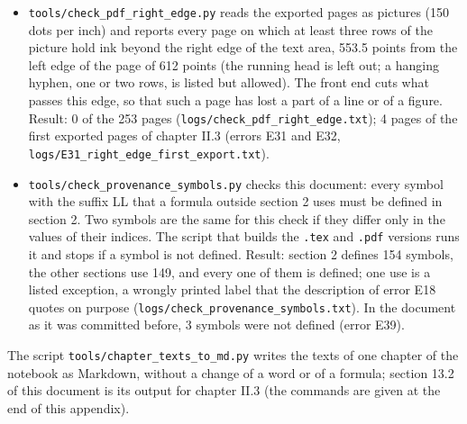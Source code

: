 \documentclass[
  10pt,
]{article}
\begin{document}
\begin{itemize}
  is used in a later chapter only if a table of the script declares it
  as the same object (for example the couplings and the colors of the
  figures), and that no global name is used as a local name (a variable
  of \texttt{Module}, \texttt{With} or \texttt{Block}, the variable of a
  loop, the argument of a function). Result: 4 chapters, 682 global
  names, 0 errors (\texttt{logs/check\_notebook\_names.txt}); 12 errors
  in the notebook as it was committed before (error E33).
\item
  \texttt{tools/check\_pdf\_right\_edge.py} reads the exported pages as
  pictures (150 dots per inch) and reports every page on which at least
  three rows of the picture hold ink beyond the right edge of the text
  area, 553.5 points from the left edge of the page of 612 points (the
  running head is left out; a hanging hyphen, one or two rows, is listed
  but allowed). The front end cuts what passes this edge, so that such a
  page has lost a part of a line or of a figure. Result: 0 of the 253
  pages (\texttt{logs/check\_pdf\_right\_edge.txt}); 4 pages of the
  first exported pages of chapter II.3 (errors E31 and E32,
  \texttt{logs/E31\_right\_edge\_first\_export.txt}).
\item
  \texttt{tools/check\_provenance\_symbols.py} checks this document:
  every symbol with the suffix LL that a formula outside section 2 uses
  must be defined in section 2. Two symbols are the same for this check
  if they differ only in the values of their indices. The script that
  builds the \texttt{.tex} and \texttt{.pdf} versions runs it and stops
  if a symbol is not defined. Result: section 2 defines 154 symbols, the
  other sections use 149, and every one of them is defined; one use is a
  listed exception, a wrongly printed label that the description of
  error E18 quotes on purpose
  (\texttt{logs/check\_provenance\_symbols.txt}). In the document as it
  was committed before, 3 symbols were not defined (error E39).
\end{itemize}

The script \texttt{tools/chapter\_texts\_to\_md.py} writes the texts of
one chapter of the notebook as Markdown, without a change of a word or
of a formula; section 13.2 of this document is its output for chapter
II.3 (the commands are given at the end of this appendix).
\end{document}
